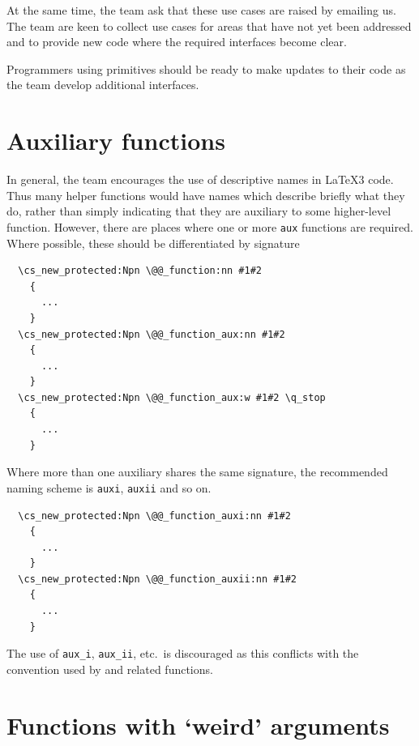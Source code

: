 \documentclass{l3doc}
\begin{document}
At the same time, the team ask that these use cases are raised by
emailing us. The team are keen to collect use cases for
areas that have not yet been addressed and to provide new code where the
required interfaces become clear.

Programmers using primitives should be ready to make updates to their
code as the team develop additional interfaces.

\section{Auxiliary functions}

In general, the team encourages the use of descriptive names in \LaTeX3 code.
Thus many helper functions would have names which describe briefly what they do,
rather than simply indicating that they are auxiliary to some higher-level
function. However, there are places where one or more \texttt{aux} functions
are required. Where possible, these should be differentiated by signature
\begin{verbatim}
  \cs_new_protected:Npn \@@_function:nn #1#2
    {
      ...
    }
  \cs_new_protected:Npn \@@_function_aux:nn #1#2
    {
      ...
    }
  \cs_new_protected:Npn \@@_function_aux:w #1#2 \q_stop
    {
      ...
    }
\end{verbatim}
Where more than one auxiliary shares the same signature, the recommended naming
scheme is \texttt{auxi}, \texttt{auxii} and so on.
\begin{verbatim}
  \cs_new_protected:Npn \@@_function_auxi:nn #1#2
    {
      ...
    }
  \cs_new_protected:Npn \@@_function_auxii:nn #1#2
    {
      ...
    }
\end{verbatim}
The use of \texttt{aux_i}, \texttt{aux_ii}, etc.\ is discouraged as this
conflicts with the convention used by  and related functions.

\section{Functions with `weird' arguments}
\end{document}
